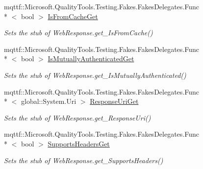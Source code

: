 \begin{DoxyCompactItemize}
mqttf\-::\-Microsoft.\-Quality\-Tools.\-Testing.\-Fakes.\-Fakes\-Delegates.\-Func\\*
$<$ bool $>$ \hyperlink{class_system_1_1_net_1_1_fakes_1_1_stub_web_response_a827255d8a3d5071335b8c98a79715f8f}{Is\-From\-Cache\-Get}
\begin{DoxyCompactList}\small\item\em Sets the stub of Web\-Response.\-get\-\_\-\-Is\-From\-Cache()\end{DoxyCompactList}\item 
mqttf\-::\-Microsoft.\-Quality\-Tools.\-Testing.\-Fakes.\-Fakes\-Delegates.\-Func\\*
$<$ bool $>$ \hyperlink{class_system_1_1_net_1_1_fakes_1_1_stub_web_response_a8a0b739cd38fcaf36ced59080dd861c8}{Is\-Mutually\-Authenticated\-Get}
\begin{DoxyCompactList}\small\item\em Sets the stub of Web\-Response.\-get\-\_\-\-Is\-Mutually\-Authenticated()\end{DoxyCompactList}\item 
mqttf\-::\-Microsoft.\-Quality\-Tools.\-Testing.\-Fakes.\-Fakes\-Delegates.\-Func\\*
$<$ global\-::\-System.\-Uri $>$ \hyperlink{class_system_1_1_net_1_1_fakes_1_1_stub_web_response_a047437e344a366ee5df97702b9b9fce2}{Response\-Uri\-Get}
\begin{DoxyCompactList}\small\item\em Sets the stub of Web\-Response.\-get\-\_\-\-Response\-Uri()\end{DoxyCompactList}\item 
mqttf\-::\-Microsoft.\-Quality\-Tools.\-Testing.\-Fakes.\-Fakes\-Delegates.\-Func\\*
$<$ bool $>$ \hyperlink{class_system_1_1_net_1_1_fakes_1_1_stub_web_response_a1b37ffcffaa3f112b86449b65c2a6f10}{Supports\-Headers\-Get}
\begin{DoxyCompactList}\small\item\em Sets the stub of Web\-Response.\-get\-\_\-\-Supports\-Headers()\end{DoxyCompactList}\end{DoxyCompactItemize}
